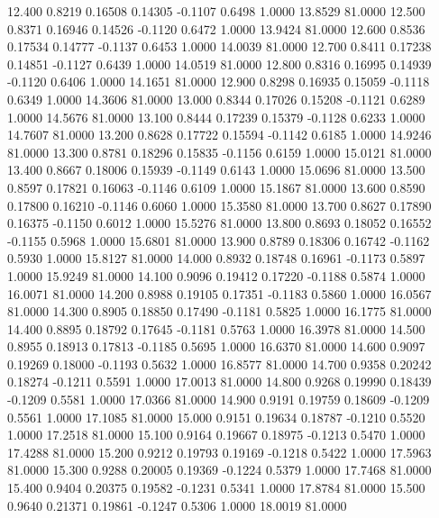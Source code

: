   12.400   0.8219   0.16508   0.14305  -0.1107   0.6498   1.0000  13.8529  81.0000
  12.500   0.8371   0.16946   0.14526  -0.1120   0.6472   1.0000  13.9424  81.0000
  12.600   0.8536   0.17534   0.14777  -0.1137   0.6453   1.0000  14.0039  81.0000
  12.700   0.8411   0.17238   0.14851  -0.1127   0.6439   1.0000  14.0519  81.0000
  12.800   0.8316   0.16995   0.14939  -0.1120   0.6406   1.0000  14.1651  81.0000
  12.900   0.8298   0.16935   0.15059  -0.1118   0.6349   1.0000  14.3606  81.0000
  13.000   0.8344   0.17026   0.15208  -0.1121   0.6289   1.0000  14.5676  81.0000
  13.100   0.8444   0.17239   0.15379  -0.1128   0.6233   1.0000  14.7607  81.0000
  13.200   0.8628   0.17722   0.15594  -0.1142   0.6185   1.0000  14.9246  81.0000
  13.300   0.8781   0.18296   0.15835  -0.1156   0.6159   1.0000  15.0121  81.0000
  13.400   0.8667   0.18006   0.15939  -0.1149   0.6143   1.0000  15.0696  81.0000
  13.500   0.8597   0.17821   0.16063  -0.1146   0.6109   1.0000  15.1867  81.0000
  13.600   0.8590   0.17800   0.16210  -0.1146   0.6060   1.0000  15.3580  81.0000
  13.700   0.8627   0.17890   0.16375  -0.1150   0.6012   1.0000  15.5276  81.0000
  13.800   0.8693   0.18052   0.16552  -0.1155   0.5968   1.0000  15.6801  81.0000
  13.900   0.8789   0.18306   0.16742  -0.1162   0.5930   1.0000  15.8127  81.0000
  14.000   0.8932   0.18748   0.16961  -0.1173   0.5897   1.0000  15.9249  81.0000
  14.100   0.9096   0.19412   0.17220  -0.1188   0.5874   1.0000  16.0071  81.0000
  14.200   0.8988   0.19105   0.17351  -0.1183   0.5860   1.0000  16.0567  81.0000
  14.300   0.8905   0.18850   0.17490  -0.1181   0.5825   1.0000  16.1775  81.0000
  14.400   0.8895   0.18792   0.17645  -0.1181   0.5763   1.0000  16.3978  81.0000
  14.500   0.8955   0.18913   0.17813  -0.1185   0.5695   1.0000  16.6370  81.0000
  14.600   0.9097   0.19269   0.18000  -0.1193   0.5632   1.0000  16.8577  81.0000
  14.700   0.9358   0.20242   0.18274  -0.1211   0.5591   1.0000  17.0013  81.0000
  14.800   0.9268   0.19990   0.18439  -0.1209   0.5581   1.0000  17.0366  81.0000
  14.900   0.9191   0.19759   0.18609  -0.1209   0.5561   1.0000  17.1085  81.0000
  15.000   0.9151   0.19634   0.18787  -0.1210   0.5520   1.0000  17.2518  81.0000
  15.100   0.9164   0.19667   0.18975  -0.1213   0.5470   1.0000  17.4288  81.0000
  15.200   0.9212   0.19793   0.19169  -0.1218   0.5422   1.0000  17.5963  81.0000
  15.300   0.9288   0.20005   0.19369  -0.1224   0.5379   1.0000  17.7468  81.0000
  15.400   0.9404   0.20375   0.19582  -0.1231   0.5341   1.0000  17.8784  81.0000
  15.500   0.9640   0.21371   0.19861  -0.1247   0.5306   1.0000  18.0019  81.0000
